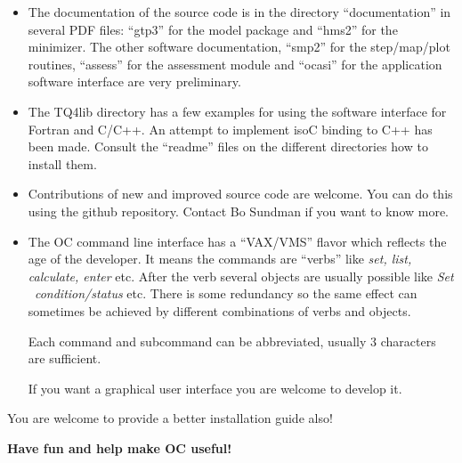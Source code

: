 \documentclass[12pt]{article}
\begin{document}
\begin{itemize}
\item The documentation of the source code is in the directory
  ``documentation'' in several PDF files: ``gtp3'' for the model
  package and ``hms2'' for the minimizer.  The other software
  documentation, ``smp2'' for the step/map/plot routines, ``assess''
  for the assessment module and ``ocasi'' for the application software
  interface are very preliminary.

\item The TQ4lib directory has a few examples for using the software
  interface for Fortran and C/C++.  An attempt to implement isoC
  binding to C++ has been made.  Consult the ``readme'' files on the
  different directories how to install them.

\item Contributions of new and improved source code are welcome.  You
  can do this using the github repository.  Contact Bo Sundman if you
  want to know more.

\item The OC command line interface has a ``VAX/VMS'' flavor which
  reflects the age of the developer.  It means the commands are
  ``verbs'' like {\em set, list, calculate, enter} etc.  After the
  verb several objects are usually possible like {\em Set
    ~condition/status} etc.  There is some redundancy so the same
  effect can sometimes be achieved by different combinations of verbs
  and objects.

  Each command and subcommand can be abbreviated, usually 3 characters
  are sufficient.

  If you want a graphical user interface you are welcome to develop
  it.
\end{itemize}

You are welcome to provide a better installation guide also!

\bigskip

{\large \bf Have fun and help make OC useful!}
\end{document}
